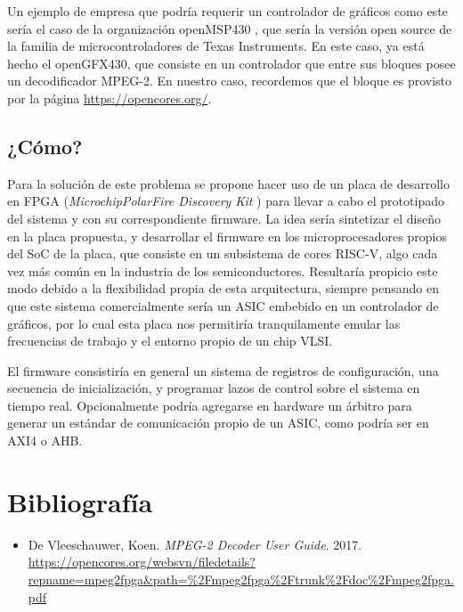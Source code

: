 \documentclass[a4,a4paper]{article}
\begin{document}
Un ejemplo de empresa que podría requerir un controlador de gráficos como este sería el caso de la organización openMSP430 , que sería la versión open source de la familia de microcontroladores de Texas Instruments. En este caso, ya está hecho el openGFX430, que consiste en un controlador que entre sus bloques posee un decodificador MPEG-2. En nuestro caso, recordemos que el bloque es provisto por la página \url{https://opencores.org/}.


\subsection{¿Cómo?}
\label{sec:como}

Para la solución de este problema se propone hacer uso de un placa de desarrollo en FPGA (\textit{Microchip\textregistered PolarFire Discovery Kit }) para llevar a cabo el prototipado del sistema y con su correspondiente firmware. La idea sería sintetizar el diseño en la placa propuesta, y desarrollar el firmware en los microprocesadores propios del SoC de la placa, que consiste en un subsistema de cores RISC-V, algo cada vez más común en la industria de los semiconductores. Resultaría propicio este modo debido a la flexibilidad propia de esta arquitectura, siempre pensando en que este sistema comercialmente sería un ASIC embebido en un controlador de gráficos, por lo cual esta placa nos permitiría tranquilamente emular las frecuencias de trabajo y el entorno propio de un chip VLSI.
\par El firmware consistiría en general un sistema de registros de configuración, una secuencia de inicialización, y programar lazos de control sobre el sistema en tiempo real. Opcionalmente podría agregarse en hardware  un árbitro para generar un estándar de comunicación propio de un ASIC, como podría ser en AXI4 o AHB.
\pagebreak
\newpage

%
%
\section{Bibliografía}
\label{sec:bibliografia}

\begin{itemize}
\item De Vleeschauwer, Koen. \textit{MPEG-2 Decoder User Guide}. 2017. \url{https://opencores.org/websvn/filedetails?repname=mpeg2fpga\&path=\%2Fmpeg2fpga\%2Ftrunk\%2Fdoc\%2Fmpeg2fpga.pdf}
\end{itemize}

\listoffigures
\end{document}
